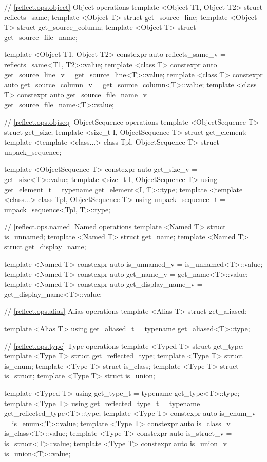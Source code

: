 \begin{std.txt}
\begin{codeblock}
{{// \ref{reflect.ops.object} Object operations
template <Object T1, Object T2> struct reflects_same;
template <Object T> struct get_source_line;
template <Object T> struct get_source_column;
template <Object T> struct get_source_file_name;

template <Object T1, Object T2>
  constexpr auto reflects_same_v = reflects_same<T1, T2>::value;
template <class T>
  constexpr auto get_source_line_v = get_source_line<T>::value;
template <class T>
  constexpr auto get_source_column_v = get_source_column<T>::value;
template <class T>
  constexpr auto get_source_file_name_v = get_source_file_name<T>::value;

// \ref{reflect.ops.objseq} ObjectSequence operations
template <ObjectSequence T> struct get_size;
template <size_t I, ObjectSequence T> struct get_element;
template <template <class...> class Tpl, ObjectSequence T>
  struct unpack_sequence;

template <ObjectSequence T>
  constexpr auto get_size_v = get_size<T>::value;
template <size_t I, ObjectSequence T>
  using get_element_t = typename get_element<I, T>::type;
template <template <class...> class Tpl, ObjectSequence T>
  using unpack_sequence_t = unpack_sequence<Tpl, T>::type;

// \ref{reflect.ops.named} Named operations
template <Named T> struct is_unnamed;
template <Named T> struct get_name;
template <Named T> struct get_display_name;

template <Named T>
  constexpr auto is_unnamed_v = is_unnamed<T>::value;
template <Named T>
  constexpr auto get_name_v = get_name<T>::value;
template <Named T>
  constexpr auto get_display_name_v = get_display_name<T>::value;

// \ref{reflect.ops.alias} Alias operations
template <Alias T> struct get_aliased;

template <Alias T>
  using get_aliased_t = typename get_aliased<T>::type;

// \ref{reflect.ops.type} Type operations
template <Typed T> struct get_type;
template <Type T> struct get_reflected_type;
template <Type T> struct is_enum;
template <Type T> struct is_class;
template <Type T> struct is_struct;
template <Type T> struct is_union;

template <Typed T>
  using get_type_t = typename get_type<T>::type;
template <Type T>
  using get_reflected_type_t = typename get_reflected_type<T>::type;
template <Type T>
  constexpr auto is_enum_v = is_enum<T>::value;
template <Type T>
  constexpr auto is_class_v = is_class<T>::value;
template <Type T>
  constexpr auto is_struct_v = is_struct<T>::value;
template <Type T>
  constexpr auto is_union_v = is_union<T>::value;

}}
\end{codeblock}
\end{std.txt}

